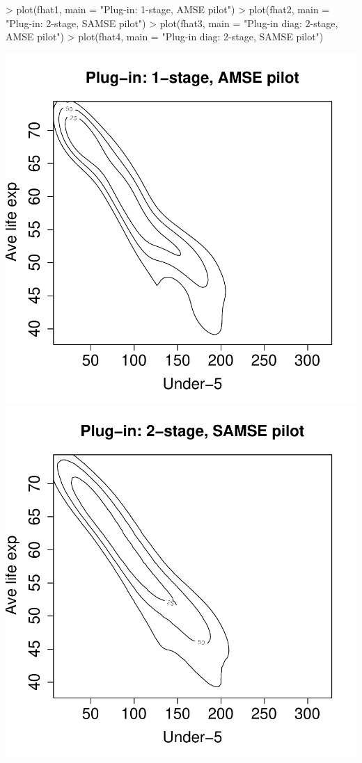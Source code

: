\documentclass[a4paper,11pt]{article}
\begin{document}
\begin{Schunk}
\begin{Sinput}
> plot(fhat1, main = "Plug-in: 1-stage, AMSE pilot")
> plot(fhat2, main = "Plug-in: 2-stage, SAMSE pilot")
> plot(fhat3, main = "Plug-in diag: 2-stage, AMSE pilot")
> plot(fhat4, main = "Plug-in diag: 2-stage, SAMSE pilot")
\end{Sinput}
\end{Schunk}
\begin{center}
\includegraphics{kde-006}
\includegraphics{kde-007}

\end{center}
\end{document}
